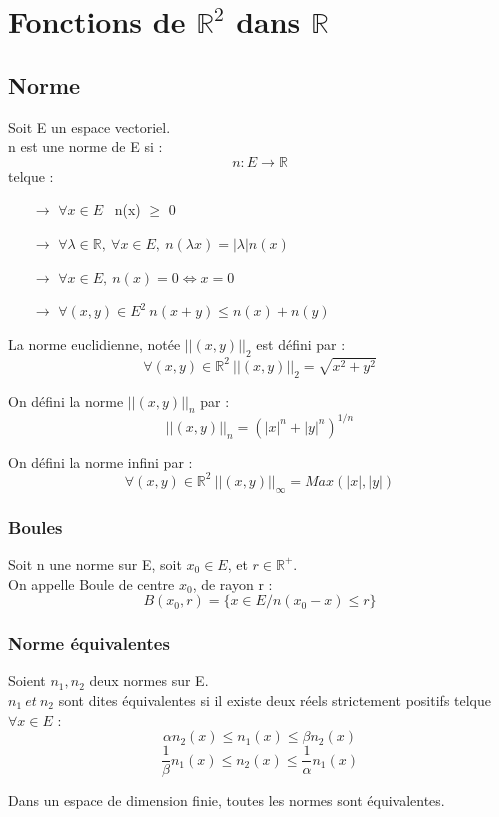 \chapter{Fonctions de $\mathbb{R}^2$ dans $\mathbb{R}$}
\section{Norme}
\begin{de}
Soit E un espace vectoriel.\\
n est une norme de E si :
$$n : E \rightarrow \mathbb{R}$$
telque :
\begin{itemize}
 \item[$\rightarrow$] $\forall x \in E$~ n(x) $\geq$ 0
 \item[$\rightarrow$] $\forall \lambda \in \mathbb{R},~ \forall x \in E,~ n(\lambda x) = |\lambda|n(x)$
 \item[$\rightarrow$] $\forall x \in E,~ n(x)=0 \Leftrightarrow x=0$
 \item[$\rightarrow$] $\forall (x,y) \in E^2~ n(x+y) \leq n(x)+n(y)$
\end{itemize}
\end{de}
\begin{prop}
La norme euclidienne, notée $||(x,y)||_2$ est défini par : 
$$\forall (x,y) \in \mathbb{R}^2~ ||(x,y)||_2 = \sqrt{x^2+y^2}$$
\end{prop}
\begin{de}
On défini la norme $||(x,y)||_n$ par : 
$$||(x,y)||_n = (|x|^n + |y|^n)^{1/n}$$
\end{de}
\begin{de}
On défini la norme infini par : 
$$\forall (x,y)\in \mathbb{R}^2~ ||(x,y)||_{\infty} = Max(|x|,|y|)$$
\end{de}
\subsection{Boules}
\begin{de}
Soit n une norme sur E, soit $x_0 \in E$, et $r \in \mathbb{R}^+$.\\
On appelle Boule de centre $x_0$, de rayon r : 
$$B(x_0,r) = \{ x \in E / n(x_0-x) \leq r\}$$ 
\end{de}
\subsection{Norme équivalentes}
\begin{de}
Soient $n_1,n_2$ deux normes sur E.\\
$n_1~ et~ n_2$ sont dites équivalentes si il existe deux réels strictement positifs telque $\forall x \in E $ : 
$$\alpha n_2(x) \leq n_1(x) \leq \beta n_2(x)$$
$$\dfrac{1}{\beta}n_1(x) \leq n_2(x) \leq \dfrac{1}{\alpha} n_1(x)$$
\end{de}
\begin{prop}
Dans un espace de dimension finie, toutes les normes sont équivalentes.
\end{prop}
